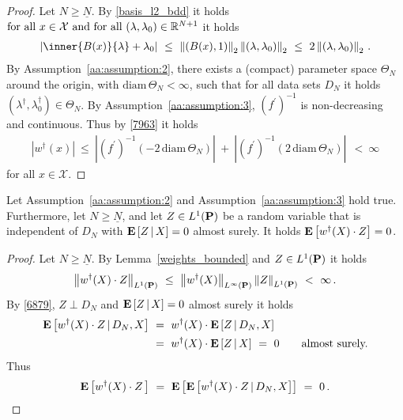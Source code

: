 \begin{proof}
  Let $N\ge \underline{N}$.
  By \eqref{basis_l2_bdd} it holds 
  $
    \text{for all}\ 
    x\in\mathcal{X}
    \
    \text{and for all}\ 
    (\lambda,\lambda_0)\in \R^{N+1}
  $ it holds
  \begin{gather}
    \label{7963}
    \left| 
    \inner{B(x)}{\lambda}
    +
    \lambda_0
    \right|
    \ 
    \le
    \ 
    \norm{(B(x),1)}_2
    \norm{(\lambda,\lambda_0)}_2
    \ 
    \le
    \ 
    2
    \norm{(\lambda,\lambda_0)}_2
    \,.
  \end{gather}
  By Assumption~\ref{aa:assumption:2}, 
  there exists a (compact) parameter space
  $\Theta_N$ around the origin, with $\mathrm{diam}\,  \Theta_N<\infty$, 
  such that for all data sets $D_N$ it holds  $(\lambda^\dagger,\lambda_0^\dagger)\in\Theta_N$.
  By Assumption~\ref{aa:assumption:3}, $(f^{'})^{-1}$ is non-decreasing and continuous. Thus
    by \eqref{7963} it holds
  \begin{align*}
    \left| 
    w^\dagger(x)
    \right|
    \ 
    \le
    \ 
    \left| 
    (f^{'})^{-1}
    \left( 
      -2
      \,
      \mathrm{diam}\,\Theta_N
    \right)
    \right|
    \ 
    +
    \ 
    \left| 
    (f^{'})^{-1}
    \left( 
      2
      \,
      \mathrm{diam}\,\Theta_N
    \right)
    \right|
    \ 
    \ 
    <
    \ 
    \infty
  \end{align*}
  for all $x\in\mathcal{X}$.
\end{proof}
\begin{lemma}
  \label{w.Z=0}
  Let Assumption~\ref{aa:assumption:2} and Assumption~\ref{aa:assumption:3} hold true.
  Furthermore, 
  let
  $N\ge\underline{N}$, and
  let
  $Z\in L^1(\P)$
  be a random variable that is independent of $D_N$ 
  with
  $
\E
\left[
  Z
  \,
  |
  \, 
  X
\right]
= 0
  $
  almost surely.
  It holds
  $
  \E
  \left[
  w^\dagger(X)\cdot Z
  \right]
  =0
  $.
\end{lemma}
\begin{proof}
  Let
  $N\ge\underline{N}$.
  By Lemma~\ref{weights_bounded} and 
  $Z\in L^1(\P)$
  it holds
  \begin{gather}
    \label{6879}
    \norm{
  w^\dagger(X)\cdot Z
    }_{L^1(\P)}
    \ 
  \le
    \ 
  \norm{w^\dagger(X)}_{L^\infty(\P)}
  \norm{Z}_{L^1(\P)}
  \ 
  <
  \ 
  \infty
  \,.
  \end{gather}
  By 
  \eqref{6879},
  $Z\perp D_N$
  and
  $
\E
\left[
  Z
  \,
  |
  \, 
  X
\right]
= 0
  $
  almost surely
  it holds 
  \begin{align*}
    \E
  \left[
  w^\dagger(X)
  \cdot
  Z
  \,
  |
  \,
  D_N,X
  \right]
  &
  \ 
  =
  \ 
  w^\dagger(X)
  \cdot
  \E
  \left[
  Z
  \,
  |
  \,
  D_N,X
  \right]
  \\
  &
  \ 
  =
  \ 
  w^\dagger(X)
  \cdot
  \E
  \left[
  Z
  \,
  |
  \,
  X
  \right]
  \
  =
  \ 
  0
  \qquad
  \text{almost surely.}
  \end{align*}
  Thus
  \begin{gather*}
    \E
    \left[
  w^\dagger(X)
  \cdot
  Z
  \,
    \right]
    \ 
    =
    \ 
    \E
    \left[
 \E
  \left[
  w^\dagger(X)
  \cdot
  Z
  \,
  |
  \,
  D_N,X
  \right]
    \right]
    \ 
    =
    \ 
    0
    \,.
     \end{gather*}
\end{proof}
